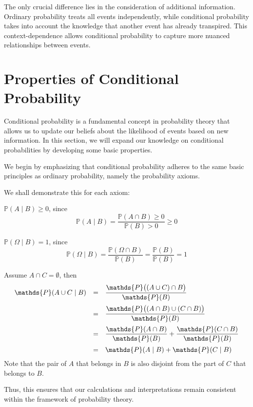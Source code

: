 
The only crucial difference lies in the consideration of additional information.  Ordinary probability treats all events independently, while conditional probability takes into account the knowledge that another event has already transpired.  This context-dependence allows conditional probability to capture more nuanced relationships between events.


\section{Properties of Conditional Probability}
Conditional probability is a fundamental concept in probability theory that allows us to update our beliefs about the likelihood of events based on new information. In this section, we will expand our knowledge on conditional probabilities by developing some basic properties.

We begin by emphasizing that conditional probability adheres to the same basic principles as ordinary probability, namely the probability axioms.
{We shall demonstrate this for each axiom:
\bi
\item[(A1)] $\mathds{P}(A\mid B)\geqslant 0$, since
\[
\mathds{P}(A\mid B)=\frac{\mathds{P}(A\cap B)\geqslant 0}{\mathds{P}(B)>0}\geqslant 0
\]
\item[(A2)] $\mathds{P}(\Omega\mid B)=1$, since
\[
\mathds{P}(\Omega\mid B)=\frac{\mathds{P}(\Omega\cap B)}{\mathds{P}(B)}=\frac{\mathds{P}(B)}{\mathds{P}(B)}=1
\]
\item[(A3)] Assume $A\cap C=\emptyset$, then
\[
\begin{array}{ccl}
\mathds{P}(A\cup C\mid B)&=&\dis\frac{\mathds{P}\big((A\cup C)\cap B\big)}{\mathds{P}(B)} \\[0.4cm]
&=&\dis\frac{\mathds{P}\big((A\cap B)\cup(C\cap B)\big)}{\mathds{P}(B)} \\[0.4cm]
&=&\dis\frac{\mathds{P}(A\cap B)}{\mathds{P}(B)} + \frac{\mathds{P}(C\cap B)}{\mathds{P}(B)} \\[0.4cm]
&=&\dis\mathds{P}(A\mid B)+\mathds{P}(C\mid B)
\end{array}
\]
Note that the pair of $A$ that belongs in $B$ is also disjoint from the part of $C$ that belongs to $B$.
\ei
}
Thus, this ensures that our calculations and interpretations remain consistent within the framework of probability theory.



